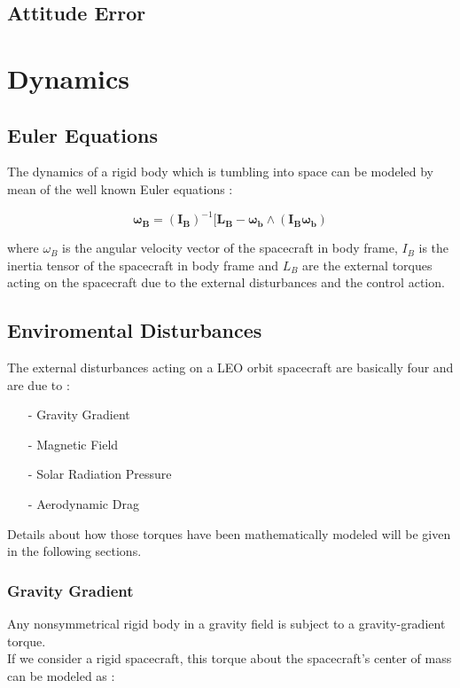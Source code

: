 \documentclass[11pt,a4paper]{report}
\begin{document}
\subsection{Attitude Error}

\section{Dynamics}
\subsection{Euler Equations}
The dynamics of a rigid body which is tumbling into space can be modeled by mean of the well known Euler equations : 

\begin{equation}
  \mathbf{\omega_B} = \mathbf{(I_B)}^{-1} [\mathbf{L_B} - \mathbf{\omega_b}  \wedge (\mathbf{I_B} \mathbf{\omega_b})
\end{equation}

where \textbf{$\omega_B$} is the angular velocity vector of the spacecraft in body frame, \textbf{$I_B$} is the inertia tensor of the spacecraft in body frame and \textbf{$L_B$} are the external torques acting on the spacecraft due to the external disturbances and the control action.

\subsection{Enviromental Disturbances}
The external disturbances acting on a LEO orbit spacecraft are basically four and are due to :

\begin{itemize}
  \item[-] Gravity Gradient
  \item[-] Magnetic Field 
  \item[-] Solar Radiation Pressure
  \item[-] Aerodynamic Drag
\end{itemize}

Details about how those torques have been mathematically modeled will be given in the following sections.

\subsubsection{Gravity Gradient}
Any nonsymmetrical rigid body in a gravity field is subject to a gravity-gradient torque.\\
If we consider a rigid spacecraft, this torque about the spacecraft's center of mass can be modeled as :
\end{document}
